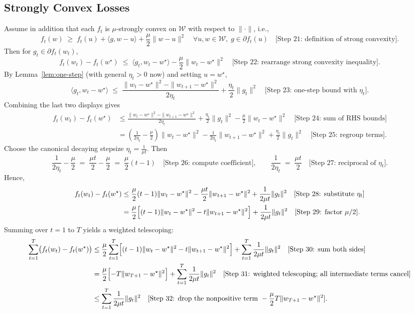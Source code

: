 \documentclass[12pt]{article}
\begin{document}
\subsection*{Strongly Convex Losses}
Assume in addition that each $f_t$ is $\mu$-strongly convex on $\mathcal{W}$ with respect to $\|\cdot\|$, i.e.,
\[
f_t(w) \;\ge\; f_t(u) + \langle g, w-u\rangle + \frac{\mu}{2}\|w-u\|^2
\quad \forall u,w\in\mathcal{W},\; g\in \partial f_t(u)
\quad \text{[Step 21: definition of strong convexity]}.
\]
Then for $g_t\in\partial f_t(w_t)$,
\[
f_t(w_t) - f_t(w^\star) \;\le\; \langle g_t, w_t - w^\star\rangle - \frac{\mu}{2}\|w_t-w^\star\|^2 
\quad \text{[Step 22: rearrange strong convexity inequality]}.
\]
By Lemma~\ref{lem:one-step} (with general $\eta_t>0$ now) and setting $u=w^\star$,
\[
\langle g_t, w_t - w^\star\rangle 
\;\le\; \frac{\|w_t-w^\star\|^2 - \|w_{t+1}-w^\star\|^2}{2\eta_t} + \frac{\eta_t}{2}\|g_t\|^2 
\quad \text{[Step 23: one-step bound with }\eta_t].
\]
Combining the last two displays gives
\begin{align*}
f_t(w_t) - f_t(w^\star)
&\le \frac{\|w_t-w^\star\|^2 - \|w_{t+1}-w^\star\|^2}{2\eta_t} 
    + \frac{\eta_t}{2}\|g_t\|^2 
    - \frac{\mu}{2}\|w_t-w^\star\|^2 
\quad \text{[Step 24: sum of RHS bounds]}\\
&= \left(\frac{1}{2\eta_t} - \frac{\mu}{2}\right)\|w_t-w^\star\|^2 - \frac{1}{2\eta_t}\|w_{t+1}-w^\star\|^2 + \frac{\eta_t}{2}\|g_t\|^2
\quad \text{[Step 25: regroup terms].}
\end{align*}
Choose the canonical decaying stepsize $\eta_t=\frac{1}{\mu t}$. Then 
\[
\frac{1}{2\eta_t} - \frac{\mu}{2} \;=\; \frac{\mu t}{2} - \frac{\mu}{2} \;=\; \frac{\mu}{2}(t-1)
\quad \text{[Step 26: compute coefficient]},\qquad
\frac{1}{2\eta_t} \;=\; \frac{\mu t}{2}
\quad \text{[Step 27: reciprocal of }\eta_t].
\]
Hence,
\begin{align*}
f_t(w_t) - f_t(w^\star)
&\le \frac{\mu}{2}(t-1)\|w_t-w^\star\|^2 - \frac{\mu t}{2}\|w_{t+1}-w^\star\|^2 + \frac{1}{2\mu t}\|g_t\|^2 
\quad \text{[Step 28: substitute }\eta_t]\\
&= \frac{\mu}{2}\Bigl[(t-1)\|w_t-w^\star\|^2 - t\|w_{t+1}-w^\star\|^2\Bigr] + \frac{1}{2\mu t}\|g_t\|^2
\quad \text{[Step 29: factor }\mu/2].
\end{align*}
Summing over $t=1$ to $T$ yields a weighted telescoping:
\begin{align*}
\sum_{t=1}^T \bigl(f_t(w_t) - f_t(w^\star)\bigr)
&\le \frac{\mu}{2}\sum_{t=1}^T \Bigl[(t-1)\|w_t-w^\star\|^2 - t\|w_{t+1}-w^\star\|^2\Bigr]
     + \sum_{t=1}^T \frac{1}{2\mu t}\|g_t\|^2 
\quad \text{[Step 30: sum both sides]}\\
&= \frac{\mu}{2}\Bigl[-T\|w_{T+1}-w^\star\|^2\Bigr]
   + \sum_{t=1}^T \frac{1}{2\mu t}\|g_t\|^2
\quad \text{[Step 31: weighted telescoping; all intermediate terms cancel]}\\
&\le \sum_{t=1}^T \frac{1}{2\mu t}\|g_t\|^2 
\quad \text{[Step 32: drop the nonpositive term }- \frac{\mu}{2} T\|w_{T+1}-w^\star\|^2].
\end{align*}
\end{document}
